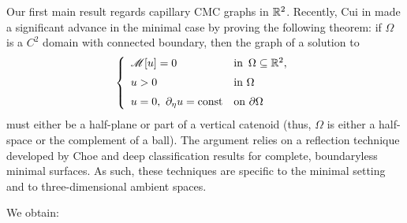 \documentclass[10 pt,a4paper]{article}
\theoremstyle{definition}
\newtheorem{remark}[definition]{Remark}
\begin{document}
Our first main result regards capillary CMC graphs in $\mathbb R^2$. Recently, Cui in \cite{cui} made a significant advance in the minimal case by proving the following theorem: if $\Omega$ is a $C^2$ domain with connected boundary, then the graph of a solution to 
\begin{equation}\label{eq_PMC_cui}
	\left\{ \begin{array}{ll}
		\mathscr{M}[u] = 0 & \text{in } \, \Omega \subseteq \mathbb R^2, \\[0.2cm]
		u > 0 & \text{in $\Omega$} \\[0.2cm]
		u=0, \ \partial_\eta u = {\rm const} & \text{on $\partial \Omega$}
	\end{array}\right.
\end{equation}
must either be a half-plane or part of a vertical catenoid (thus, $\Omega$ is either a half-space or the complement of a ball). The argument relies on a reflection technique developed by Choe \cite{choe} and deep classification results for complete, boundaryless  minimal surfaces. As such, these techniques are specific to the minimal setting and to three-dimensional ambient spaces.



%



We obtain: 
\end{document}
